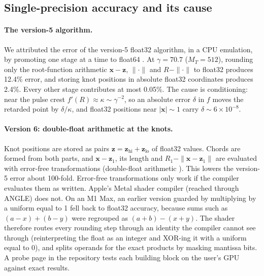\documentclass[11pt, a4paper]{article}
\begin{document}
\subsection{Single-precision accuracy and its cause}\label{sec:precision}
\paragraph{The version-5 algorithm.} We attributed the error of the version-5 float32 algorithm, in a CPU emulation, by promoting one stage at a time to float64 \cite{swarm2026}. At $\gamma = 70.7$ ($M_T = 512$), rounding only the root-function arithmetic $\mathbf{x} - \mathbf{z}$, $\|\cdot\|$ and $R - \|\cdot\|$ to float32 produces 12.4\% error, and storing knot positions in absolute float32 coordinates produces 2.4\%. Every other stage contributes at most 0.05\%. The cause is conditioning: near the pulse crest $f'(R) \approx \kappa \sim \gamma^{-2}$, so an absolute error $\delta$ in $f$ moves the retarded point by $\delta/\kappa$, and float32 positions near $|\mathbf{x}| \sim 1$ carry $\delta \sim 6\times10^{-8}$.

\paragraph{Version 6: double-float arithmetic at the knots.} Knot positions are stored as pairs $\mathbf{z} = \mathbf{z}_{\text{hi}} + \mathbf{z}_{\text{lo}}$ of float32 values. Chords are formed from both parts, and $\mathbf{x} - \mathbf{z}_1$, its length and $R_1 - \|\mathbf{x} - \mathbf{z}_1\|$ are evaluated with error-free transformations (double-float arithmetic \cite{thall2006, dagraca2006}). This lowers the version-5 error about 100-fold. Error-free transformations only work if the compiler evaluates them as written. Apple's Metal shader compiler (reached through ANGLE) does not. On an M1 Max, an earlier version guarded by multiplying by a uniform equal to 1 fell back to float32 accuracy, because sums such as $(a - x) + (b - y)$ were regrouped as $(a + b) - (x + y)$. The shader therefore routes every rounding step through an identity the compiler cannot see through (reinterpreting the float as an integer and XOR-ing it with a uniform equal to 0), and splits operands for the exact products by masking mantissa bits. A probe page in the repository tests each building block on the user's GPU against exact results.
\end{document}
